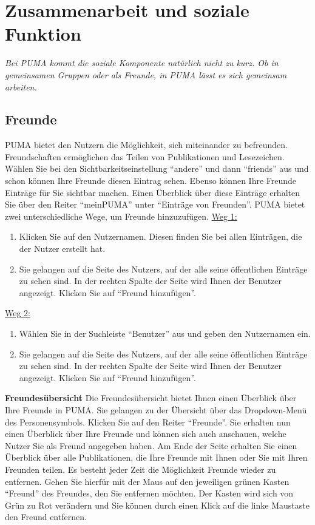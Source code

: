 \section{Zusammenarbeit und soziale Funktion}
\textit{Bei PUMA kommt die soziale Komponente natürlich nicht zu kurz. Ob in gemeinsamen Gruppen oder als Freunde, in PUMA lässt es sich gemeinsam arbeiten.}
\subsection{Freunde}%
PUMA bietet den Nutzern die Möglichkeit, sich miteinander zu befreunden. Freundschaften ermöglichen das Teilen von Publikationen und Lesezeichen. Wählen Sie bei den Sichtbarkeitseinstellung \enquote{andere} und dann \enquote{friends} aus und schon können Ihre Freunde diesen Eintrag sehen. Ebenso können Ihre Freunde Einträge für Sie sichtbar machen. Einen Überblick über diese Einträge erhalten Sie über den Reiter \enquote{meinPUMA} unter \enquote{Einträge von Freunden}.\newline
PUMA bietet zwei unterschiedliche Wege, um Freunde hinzuzufügen.
\newline
\newline
\underline{Weg 1:}
\begin{enumerate} 
    \item Klicken Sie auf den Nutzernamen. Diesen finden Sie bei allen Einträgen, die der Nutzer erstellt hat.
    \item Sie gelangen auf die Seite des Nutzers, auf der alle seine öffentlichen Einträge zu sehen sind. In der rechten Spalte der Seite wird Ihnen der Benutzer angezeigt. Klicken Sie auf \enquote{Freund hinzufügen}.
\end{enumerate}
\underline{Weg 2:}
\begin{enumerate}
    \item Wählen Sie in der Suchleiste \enquote{Benutzer} aus und geben den Nutzernamen ein.
    \item Sie gelangen auf die Seite des Nutzers, auf der alle seine öffentlichen Einträge zu sehen sind. In der rechten Spalte der Seite wird Ihnen der Benutzer angezeigt. Klicken Sie auf \enquote{Freund hinzufügen}.
\end{enumerate}
\textbf{Freundesübersicht} \newline
Die Freundesübersicht bietet Ihnen einen Überblick über Ihre Freunde in PUMA. Sie gelangen zu der Übersicht über das Dropdown-Menü des Personensymbols. Klicken Sie auf den Reiter \enquote{Freunde}. Sie erhalten nun einen Überblick über Ihre Freunde und können sich auch anschauen, welche Nutzer Sie als Freund angegeben haben. Am Ende der Seite erhalten Sie einen Überblick über alle Publikationen, die Ihre Freunde mit Ihnen oder Sie mit Ihren Freunden teilen.\newline
Es besteht jeder Zeit die Möglichkeit Freunde wieder zu entfernen. Gehen Sie hierfür mit der Maus auf den jeweiligen grünen Kasten \enquote{Freund} des Freundes, den Sie entfernen möchten. Der Kasten wird sich von Grün zu Rot verändern und Sie können durch einen Klick auf die linke Maustaste den Freund entfernen. 
